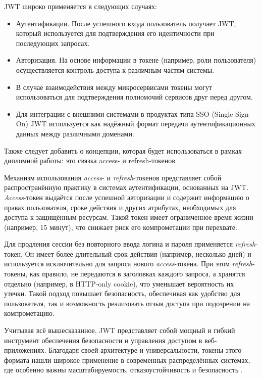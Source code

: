 \documentclass[diploma]{SCWorks}
\begin{document}
JWT широко применяется в следующих случаях:

\begin{itemize}
    \item Аутентификации. После успешного входа пользователь получает JWT, 
    который используется для подтверждения его идентичности при последующих 
    запросах.
    \item Авторизация. На основе информации в токене (например, роли 
    пользователя) осуществляется контроль доступа к различным частям системы.
    \item В случае взаимодействия между микросервисами токены могут 
    использоваться для подтверждения полномочий сервисов друг перед другом.
    \item Для интеграции с внешними системами в продуктах типа SSO 
    (Single Sign-On) JWT используется как надёжный формат передачи 
    аутентификационных данных между различными доменами.
\end{itemize}

Также следует добавить о концепции, которая будет использоваться в рамках 
дипломной работы: это связка access- и refresh-токенов.

Механизм использования \textit{access}- и \textit{refresh}-токенов 
представляет собой распространённую практику в системах аутентификации, 
основанных на JWT. \textit{Access}-токен выдаётся после успешной авторизации 
и содержит информацию о правах пользователя, сроке действия и других 
атрибутах, необходимых для доступа к защищённым ресурсам. Такой токен имеет 
ограниченное время жизни (например, 15 минут), что снижает риск его 
компрометации при перехвате.

Для продления сессии без повторного ввода логина и пароля применяется 
\textit{refresh}-токен. Он имеет более длительный срок действия (например, 
несколько дней) и используется исключительно для запроса нового 
\textit{access}-токена. При этом \textit{refresh}-токены, как правило, не 
передаются в заголовках каждого запроса, а хранятся отдельно (например, 
в HTTP-only cookie), что уменьшает вероятность их утечки. Такой подход 
повышает безопасность, обеспечивая как удобство для пользователя, так и 
возможность реализовать отзыв доступа при подозрении на компрометацию.

Учитывая всё вышесказанное, JWT представляет собой мощный и гибкий 
инструмент обеспечения безопасности и управления доступом в веб-приложениях. 
Благодаря своей архитектуре и универсальности, токены этого формата нашли 
широкое применение в современных распределённых системах, где особенно важны 
масштабируемость, отказоустойчивость и безопасность \cite{jwt,oauth2}. 
\end{document}
